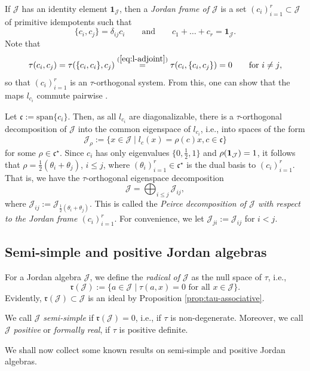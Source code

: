 \documentclass[10pt,a4paper]{amsart}
\numberwithin{equation}{section}
\newcommand{\be}{\begin{equation}}
\newcommand{\ee}{\end{equation}}
\newcommand{\Jcal}{\mathcal{J}}
\newcommand{\cf}{{\mathfrak c}}
\newcommand{\sspan}{{\mathrm{span}}}
\begin{document}
If $\Jcal$ has an identity element $\mathbf{1}_\Jcal$, then a {\em Jordan frame of $\Jcal$ }is a set $(c_i)_{i=1}^r \subset \Jcal$ of primitive idempotents such that
\be \label{eq:Jordan-frame}
\{c_i, c_j\} = \delta_{ij} c_i \qquad \text{and} \qquad c_1 + \dots + c_r = \mathbf{1}_\Jcal.
\ee
Note that
\[
\tau(c_i, c_j) = \tau(\{c_i, c_i\}, c_j) \stackrel{(\ref{eq:l-adjoint})}= \tau(c_i, \{c_i, c_j\}) = 0 \qquad \text{for $i \neq j$},
\]
so that $(c_i)_{i=1}^r$ is an $\tau$-orthogonal system. From this, one can show that the maps $l_{c_i}$ commute pairwise \cite[Lemma IV.1.3]{F-K-1994}.

Let $\cf := \sspan\{c_i\}$. Then, as all $l_{c_i}$ are diagonalizable, there is a $\tau$-orthogonal decomposition of $\Jcal$ into the common eigenspace of $l_{c_i}$, i.e., into spaces of the form
\[
\Jcal_\rho := \{ x \in \Jcal \mid l_{c}(x) = \rho(c) x, c \in \cf\}
\]
for some $\rho \in \cf^\star$. Since $c_i$ has only eigenvalues $\big\{0, \frac12, 1\big\}$ and $\rho({\bf 1}_\Jcal) = 1$, it follows that $\rho = \frac12(\theta_i + \theta_j)$, $i \leq j$, where $(\theta_i)_{i=1}^r \in \cf^\star$ is the dual basis to $(c_i)_{i=1}^r$. That is, we have the $\tau$-orthogonal eigenspace decomposition
\be \label{eq:Peirce}
\Jcal = \bigoplus_{i \leq j} \Jcal_{ij},
\ee
where $\Jcal_{ij} := \Jcal_{\frac12(\theta_i + \theta_j)}$. This is called the {\em Peirce decomposition of $\Jcal$ with respect to the Jordan frame $(c_i)_{i=1}^r$}. For convenience, we let $\Jcal_{ji} := \Jcal_{ij}$ for $i < j$.

\subsection{Semi-simple and positive Jordan algebras}

For a Jordan algebra $\Jcal$, we define the {\em radical of $\Jcal$ }as the null space of $\tau$, i.e.,
\[%
{\mathfrak r}(\Jcal) := \{ a \in \Jcal \mid \tau(a,x) = 0 \text{ for all $x \in \Jcal$}\}.
\]
Evidently, ${\mathfrak r}(\Jcal) \subset \Jcal$ is an ideal by Proposition \ref{prop:tau-associative}.

We call $\Jcal$ {\em semi-simple} if ${\mathfrak r}(\Jcal) = 0$, i.e., if $\tau$ is non-degenerate. Moreover, we call $\Jcal$ {\em positive }or {\em formally real}, if $\tau$ is positive definite.

We shall now collect some known results on semi-simple and positive Jordan algebras.
\end{document}
